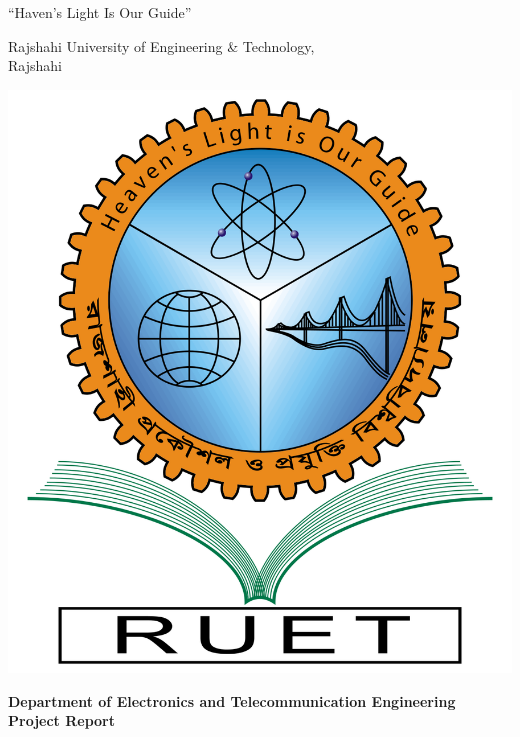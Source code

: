 
\begin{titlepage}
    \begin{center}
        ``Haven's Light Is Our Guide''\\

        \vspace{0.25cm}

        \begin{huge}
            Rajshahi University of Engineering \& Technology,\\
            Rajshahi\\
        \end{huge}

        \vspace{0.5cm}

        \includegraphics[scale=.18]{images/ruet_logo.png}
        \\
        \vspace{.5cm}

        \begin{Large}
            \textbf{Department of Electronics and Telecommunication Engineering}\\
            \huge
            \textbf{Project Report} \\
        \end{Large}


\end{center}
\end{titlepage}
